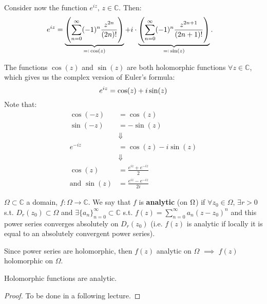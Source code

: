 \begin{remark}
Consider now the function $e^{iz}, \, z\in\mathbb{C}$. Then:
\begin{align*}
    e^{iz}&=\underbrace{\left( \sum_{n=0}^\infty (-1)^n \frac{z^{2n}}{(2n)!}  \right)}_{=\vcentcolon \, \cos(z)} + i \cdot \underbrace{\left( \sum_{n=0}^\infty (-1)^n \frac{z^{2n+1}}{(2n+1)!}  \right)}_{=\vcentcolon \, \sin(z)}.
\end{align*}

The functions $\cos(z)$ and $\sin(z)$ are both holomorphic functions $\forall z \in \mathbb{C}$, which gives us the complex version of Euler's formula:
\begin{equation*}
e^{iz} = \cos(z) + i\sin(z)\\
\end{equation*}
Note that:
\begin{align*}
    \cos(-z) &= \cos(z)\\
    \sin(-z) &= -\sin(z)\\
    &\Downarrow\\
    e^{-iz} &= \cos(z) - i\sin(z)\\
    &\Downarrow\\
    \cos(z) &= \frac{e^{iz}+e^{-iz}}{2}\\
    \text{and } \sin(z) &= \frac{e^{iz}-e^{-iz}}{2i}
\end{align*}
\end{remark}

\begin{definition}
$\Omega \subset \mathbb{C}$ a domain, $f:\Omega \rightarrow \mathbb{C}$. We say that $f$ is \textbf{analytic} (on $\Omega$) if $\forall z_0 \in \Omega$, $\exists r>0$ s.t. $D_r(z_0) \subset \Omega$ and $\exists \{ a_n  \}_{n=0}^\infty \subset \mathbb{C}$ s.t. $f(z) = \sum_{n=0}^\infty a_n (z-z_0)^n$ and this power series converges absolutely on $D_r(z_0)$ (i.e. $f(z)$ is analytic if locally it is equal to an absolutely convergent power series).
\end{definition}

\begin{remark}
Since power series are holomorphic, then $f(z)$ analytic on  $\Omega$ $\implies$ $f(z)$ holomorphic on $\Omega$. 
\end{remark}

\begin{theorem}
Holomorphic functions are analytic.
\end{theorem}

\begin{proof}
To be done in a following lecture.
\end{proof}

